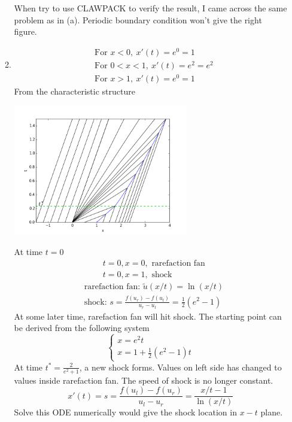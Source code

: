 \documentclass[11pt]{article}
\begin{document}
\begin{enumerate}
\begin{enumerate}
				When try to use CLAWPACK to verify the result, I came across the same problem as in (a). Periodic boundary condition won't give the right figure.
				
			\item
				\begin{align*}
				&\text{For } x<0, \ x'(t)=e^0=1\\
				&\text{For } 0<x<1, \ x'(t)=e^2=e^2\\
				&\text{For } x>1, \ x'(t)=e^0=1
				\end{align*}
				From the characteristic structure

				\hfil\includegraphics[width=3.0in]{problem_11_8c_char.png}\hfil
			
				At time $t=0$ 
				\begin{align*}
				& t=0, x=0, \text{ rarefaction fan}\\
				& t=0, x=1, \text{ shock}
				\end{align*}
				\begin{align*}
				&\text{rarefaction fan: } \tilde{u}(x/t)=\ln(x/t)\\
				&\text{shock: } s=\frac{f(u_r)-f(u_l)}{u_r-u_l}=\frac{1}{2}(e^2-1)
				\end{align*}
				At some later time, rarefaction fan will hit shock. The starting point can be derived from the following system
				\[
				\begin{cases}
				x=e^2t\\
				x=1+\frac{1}{2}(e^2-1)t
				\end{cases}
				\]
				At time $t^*=\frac{2}{e^2+1}$, a new shock forms. Values on left side has changed to values inside rarefaction fan. The speed of shock is no longer constant.
				\[
				x'(t)=s=\frac{f(u_l)-f(u_r)}{u_l-u_r}=\frac{x/t-1}{\ln(x/t)}
				\]
				Solve this ODE numerically would give the shock location in $x-t$ plane.\\
				

\end{enumerate}
\end{enumerate}
\end{document}
